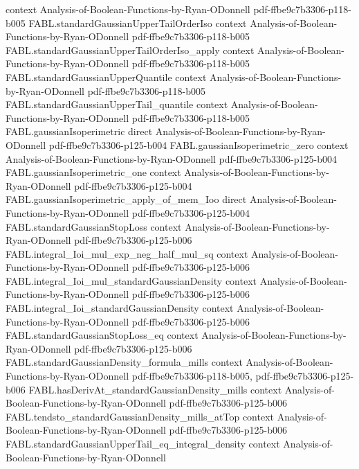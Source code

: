 \begin{theorem}
  {context}
  {Analysis-of-Boolean-Functions-by-Ryan-ODonnell}
  {pdf-ffbe9c7b3306-p118-b005}
\proofstep
  {FABL.standardGaussianUpperTailOrderIso}
  {context}
  {Analysis-of-Boolean-Functions-by-Ryan-ODonnell}
  {pdf-ffbe9c7b3306-p118-b005}
\proofstep
  {FABL.standardGaussianUpperTailOrderIso_apply}
  {context}
  {Analysis-of-Boolean-Functions-by-Ryan-ODonnell}
  {pdf-ffbe9c7b3306-p118-b005}
\proofstep
  {FABL.standardGaussianUpperQuantile}
  {context}
  {Analysis-of-Boolean-Functions-by-Ryan-ODonnell}
  {pdf-ffbe9c7b3306-p118-b005}
\proofstep
  {FABL.standardGaussianUpperTail_quantile}
  {context}
  {Analysis-of-Boolean-Functions-by-Ryan-ODonnell}
  {pdf-ffbe9c7b3306-p118-b005}
\proofstep
  {FABL.gaussianIsoperimetric}
  {direct}
  {Analysis-of-Boolean-Functions-by-Ryan-ODonnell}
  {pdf-ffbe9c7b3306-p125-b004}
\proofstep
  {FABL.gaussianIsoperimetric_zero}
  {context}
  {Analysis-of-Boolean-Functions-by-Ryan-ODonnell}
  {pdf-ffbe9c7b3306-p125-b004}
\proofstep
  {FABL.gaussianIsoperimetric_one}
  {context}
  {Analysis-of-Boolean-Functions-by-Ryan-ODonnell}
  {pdf-ffbe9c7b3306-p125-b004}
\proofstep
  {FABL.gaussianIsoperimetric_apply_of_mem_Ioo}
  {direct}
  {Analysis-of-Boolean-Functions-by-Ryan-ODonnell}
  {pdf-ffbe9c7b3306-p125-b004}
\proofstep
  {FABL.standardGaussianStopLoss}
  {context}
  {Analysis-of-Boolean-Functions-by-Ryan-ODonnell}
  {pdf-ffbe9c7b3306-p125-b006}
\proofstep
  {FABL.integral_Ioi_mul_exp_neg_half_mul_sq}
  {context}
  {Analysis-of-Boolean-Functions-by-Ryan-ODonnell}
  {pdf-ffbe9c7b3306-p125-b006}
\proofstep
  {FABL.integral_Ioi_mul_standardGaussianDensity}
  {context}
  {Analysis-of-Boolean-Functions-by-Ryan-ODonnell}
  {pdf-ffbe9c7b3306-p125-b006}
\proofstep
  {FABL.integral_Ioi_standardGaussianDensity}
  {context}
  {Analysis-of-Boolean-Functions-by-Ryan-ODonnell}
  {pdf-ffbe9c7b3306-p125-b006}
\proofstep
  {FABL.standardGaussianStopLoss_eq}
  {context}
  {Analysis-of-Boolean-Functions-by-Ryan-ODonnell}
  {pdf-ffbe9c7b3306-p125-b006}
\proofstep
  {FABL.standardGaussianDensity_formula_mills}
  {context}
  {Analysis-of-Boolean-Functions-by-Ryan-ODonnell}
  {pdf-ffbe9c7b3306-p118-b005,
    pdf-ffbe9c7b3306-p125-b006}
\proofstep
  {FABL.hasDerivAt_standardGaussianDensity_mills}
  {context}
  {Analysis-of-Boolean-Functions-by-Ryan-ODonnell}
  {pdf-ffbe9c7b3306-p125-b006}
\proofstep
  {FABL.tendsto_standardGaussianDensity_mills_atTop}
  {context}
  {Analysis-of-Boolean-Functions-by-Ryan-ODonnell}
  {pdf-ffbe9c7b3306-p125-b006}
\proofstep
  {FABL.standardGaussianUpperTail_eq_integral_density}
  {context}
  {Analysis-of-Boolean-Functions-by-Ryan-ODonnell}

\end{theorem}
